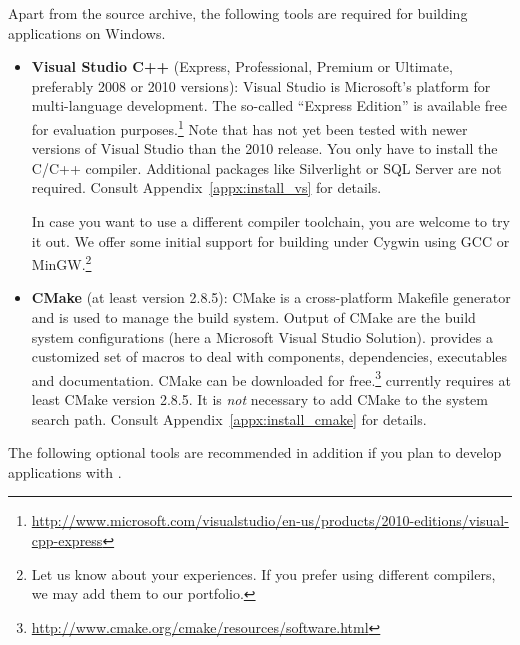 Apart from the \xme source archive, the following tools are required for building \xme applications on Windows.
\begin{itemize}
	\item \textbf{Visual Studio C++} (Express, Professional, Premium or Ultimate, preferably 2008 or 2010 versions):
		Visual Studio is Microsoft's platform for multi-language development.
		The so-called ``Express Edition'' is available free for evaluation purposes.\footnote{%
		\url{http://www.microsoft.com/visualstudio/en-us/products/2010-editions/visual-cpp-express}}
		Note that \xme has not yet been tested with newer versions of Visual Studio than the 2010 release.
		You only have to install the C/C++ compiler. Additional packages like Silverlight or SQL Server are not required.
		Consult Appendix~\ref{appx:install_vs} for details.
		
		In case you want to use a different compiler toolchain, you are welcome to try it out.
		We offer some initial support for building under Cygwin using GCC or MinGW.\footnote{%
			Let us know about your experiences.
			If you prefer using different compilers, we may add them to our portfolio.
		}
	
	\item \textbf{CMake} (at least version 2.8.5):
		CMake is a cross-platform Makefile generator and is used to manage the build system.
		Output of CMake are the build system configurations (here a Microsoft Visual Studio Solution).
		\xme provides a customized set of macros to deal with components, dependencies, executables and documentation.
		CMake can be downloaded for free.\footnote{\url{http://www.cmake.org/cmake/resources/software.html}}
		\xme currently requires at least CMake version 2.8.5.
		It is \emph{not} necessary to add CMake to the system search path.
		Consult Appendix~\ref{appx:install_cmake} for details.
\end{itemize}
%
The following optional tools are recommended in addition if you plan to develop applications with \xme.
